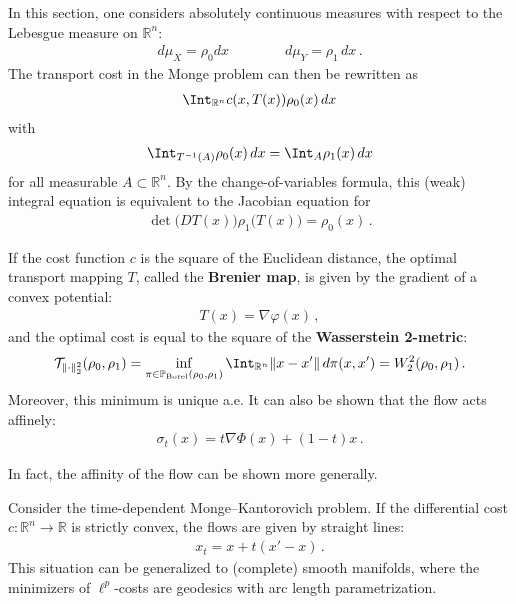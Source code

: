     In this section, one considers absolutely continuous measures with respect to the Lebesgue measure on $\mathbb{R}^n$:
    \begin{gather}
        d\mu_X = \rho_0dx\qquad\qquad d\mu_Y = \rho_1\,dx\,.
    \end{gather}
    The transport cost in the Monge problem can then be rewritten as
    \begin{gather}
        \Int_{\mathbb{R}^n}c(x,T(x))\rho_0(x)\,dx
    \end{gather}
    with
    \begin{gather}
        \Int_{T^{-1}(A)}\rho_0(x)\,dx = \Int_A\rho_1(x)\,dx
    \end{gather}
    for all measurable $A\subset\mathbb{R}^n$. By the change-of-variables formula, this (weak) integral equation is equivalent to the Jacobian equation for
    \begin{gather}
        \det\bigl(DT(x)\bigr)\rho_1\bigl(T(x)\bigr)=\rho_0(x)\,.
    \end{gather}

    \begin{example}
        If the cost function $c$ is the square of the Euclidean distance, the optimal transport mapping $T$, called the \textbf{Brenier map}, is given by the gradient of a convex potential:
        \begin{gather}
            T(x) = \nabla\varphi(x)\,,
        \end{gather}
        and the optimal cost is equal to the square of the \textbf{Wasserstein 2-metric}:
        \begin{gather}
            \mathcal{T}_{\|\cdot\|_2^2}(\rho_0,\rho_1) = \inf_{\pi\in\mathbb{P}_{\text{Borel}}(\rho_0,\rho_1)}\Int_{\mathbb{R}^n}\|x-x'\|\,d\pi(x,x')=W^2_2(\rho_0,\rho_1)\,.
        \end{gather}
        Moreover, this minimum is unique a.e. It can also be shown that the flow acts affinely:
        \begin{gather}
            \sigma_t(x) = t\nabla\Phi(x) + (1-t)x\,.
        \end{gather}
    \end{example}

    In fact, the affinity of the flow can be shown more generally.
    \begin{property}
        Consider the time-dependent Monge--Kantorovich problem. If the differential cost $c:\mathbb{R}^n\rightarrow\mathbb{R}$ is strictly convex, the flows are given by straight lines:
        \begin{gather}
            x_t = x + t(x'-x)\,.
        \end{gather}
        This situation can be generalized to (complete) smooth manifolds, where the minimizers of $\ell^p$-costs are geodesics with arc length parametrization.
    \end{property}

